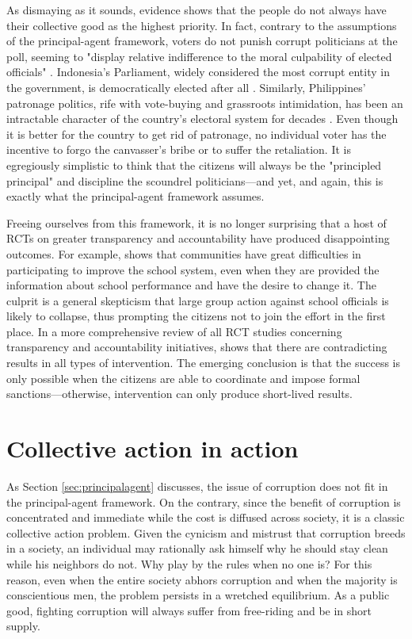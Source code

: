 \documentclass[12pt]{article}
\begin{document}
As dismaying as it sounds, evidence shows that the people do not always have their collective good as the highest priority. In fact, contrary to the assumptions of the principal-agent framework, voters do not punish corrupt politicians at the poll, seeming to "display relative indifference to the moral culpability of elected officials" \citep{Chang2007}. Indonesia's Parliament, widely considered the most corrupt entity in the government, is democratically elected after all \citep{Integrity2012a}. Similarly, Philippines' patronage politics, rife with vote-buying and grassroots intimidation, has been an intractable character of the country's electoral system for decades \citep{Sidel1999}. Even though it is better for the country to get rid of patronage, no individual voter has the incentive to forgo the canvasser's bribe or to suffer the retaliation. It is egregiously simplistic to think that the citizens will always be the "principled principal" and discipline the scoundrel politicians---and yet, and again, this is exactly what the principal-agent framework assumes.

Freeing ourselves from this framework, it is no longer surprising that a host of RCTs on greater transparency and accountability have produced disappointing outcomes. For example, \citet{Banerjee2010} shows that communities have great difficulties in participating to improve the school system, even when they are provided the information about school performance and have the desire to change it. The culprit is a general skepticism that large group action against school officials is likely to collapse, thus prompting the citizens not to join the effort in the first place. In a more comprehensive review of all RCT studies concerning transparency and accountability initiatives, \citet{Joshi2010a} shows that there are contradicting results in all types of intervention. The emerging conclusion is that the success is only possible when the citizens are able to coordinate and impose formal sanctions---otherwise, intervention can only produce short-lived results.

\section{Collective action in action} \label{sec:collectiveaction}

As Section \ref{sec:principalagent} discusses, the issue of corruption does not fit in the principal-agent framework. On the contrary, since the benefit of corruption is concentrated and immediate while the cost is diffused across society, it is a classic collective action problem. Given the cynicism and mistrust that corruption breeds in a society, an individual may rationally ask himself why he should stay clean while his neighbors do not. Why play by the rules when no one is? For this reason, even when the entire society abhors corruption and when the majority is conscientious men, the problem persists in a wretched equilibrium. As a public good, fighting corruption will always suffer from free-riding and be in short supply.
\end{document}
